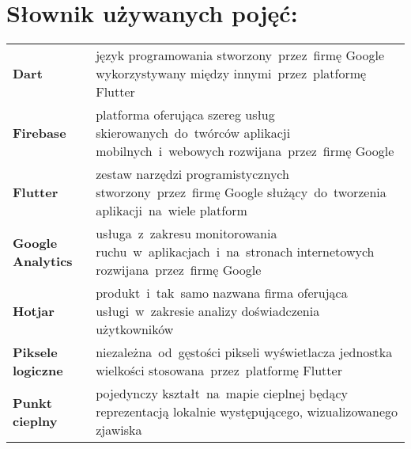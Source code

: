 \section*{Słownik używanych pojęć:}

\begin{table}[H]
\begin{tabularx}{\textwidth}{ m{2.8cm} X }
	\textbf{Dart} \dotfill & język programowania stworzony~przez~firmę Google wykorzystywany między innymi~przez~platformę Flutter \\
	\textbf{Firebase} \dotfill & platforma oferująca szereg usług skierowanych~do~twórców aplikacji mobilnych~i~webowych rozwijana~przez~firmę Google \\
	\textbf{Flutter} \dotfill & zestaw narzędzi programistycznych stworzony~przez~firmę Google służący~do~tworzenia aplikacji~na~wiele platform \\
	\textbf{Google Analytics} \dotfill & usługa~z~zakresu monitorowania ruchu~w~aplikacjach~i~na~stronach internetowych rozwijana~przez~firmę Google \\
	\textbf{Hotjar} \dotfill & produkt~i~tak~samo nazwana firma oferująca usługi~w~zakresie analizy doświadczenia użytkowników \\
	\textbf{Piksele logiczne} \dotfill & niezależna~od~gęstości pikseli wyświetlacza jednostka wielkości stosowana~przez~platformę Flutter \\
	\textbf{Punkt cieplny} \dotfill & pojedynczy kształt~na~mapie cieplnej będący reprezentacją lokalnie występującego, wizualizowanego zjawiska \\
\end{tabularx}
\end{table}
